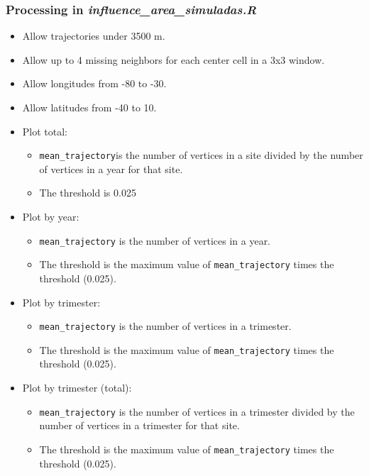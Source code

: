 \documentclass[aspectratio=169]{beamer}
\begin{document}
\begin{frame}
    \frametitle{Processing in \textit{influence\_area\_simuladas.R}}
    \begin{itemize}
        \item Allow trajectories under 3500 m.
        \item Allow up to 4 missing neighbors for each center cell
            in a 3x3 window.
        \item Allow longitudes from -80 to -30.
        \item Allow latitudes from -40 to 10.
        \item Plot total:
            \begin{itemize}
                \item \verb|mean_trajectory|is the number of vertices in a site 
                    divided by the number of vertices in a year for that site.
                \item The threshold is 0.025
            \end{itemize}
        \item Plot by year:
            \begin{itemize}
                \item \verb|mean_trajectory| is the number of vertices in a 
                    year.
                \item The threshold is the maximum value of 
                    \verb|mean_trajectory| times the threshold (0.025).
            \end{itemize}
        \item Plot by trimester:
            \begin{itemize}
                \item \verb|mean_trajectory| is the number of vertices in a 
                    trimester.
                \item The threshold is the maximum value of 
                    \verb|mean_trajectory| times the threshold (0.025).
            \end{itemize}
        \item Plot by trimester (total):
            \begin{itemize}
                \item \verb|mean_trajectory| is the number of vertices in a 
                    trimester divided by the number of vertices in a trimester 
                    for that site.
                \item The threshold is the maximum value of 
                    \verb|mean_trajectory| times the threshold (0.025).
            \end{itemize}
    \end{itemize}
\end{frame}
\end{document}

